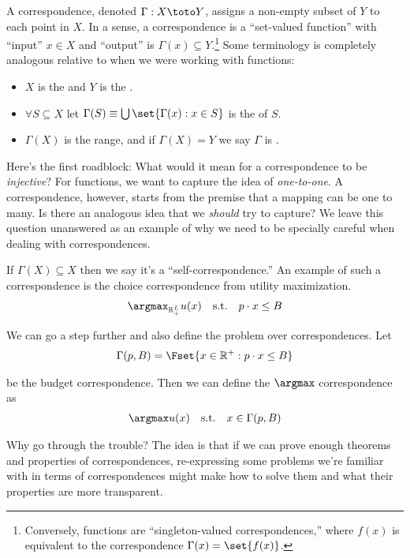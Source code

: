 \documentclass{article}
\begin{document}
A correspondence, denoted $\Gamma: X \toto Y$, assigns a non-empty subset of $Y$ to each point in $X$. In a sense, a correspondence is a ``set-valued function'' with ``input'' $x \in X$ and ``output'' is $\Gamma(x) \subseteq Y$.\footnote{Conversely, functions are ``singleton-valued correspondences,'' where $f(x)$ is equivalent to the correspondence $\Gamma(x) = \set{f(x)}$.} Some terminology is completely analogous relative to when we were working with functions:
\begin{itemize}[label=$\bullet$]
  \item $X$ is the  and $Y$ is the .

  \item $\forall S \subseteq X$ let $\Gamma(S) \equiv \bigcup\set{\Gamma(x): x \in S}$ is the  of $S$.

  \item $\Gamma(X)$ is the range, and if $\Gamma(X) = Y$ we say $\Gamma$ is .
\end{itemize}

Here's the first roadblock: What would it mean for a correspondence to be \textit{injective}? For functions, we want to capture the idea of \textit{one-to-one}. A correspondence, however, starts from the premise that a mapping can be one to many. Is there an analogous idea that we \textit{should} try to capture? We leave this question unanswered as an example of why we need to be specially careful when dealing with correspondences.
\begin{example}
  If $\Gamma(X) \subseteq X$ then we say it's a ``self-correspondence.'' An example of such a correspondence is the choice correspondence from utility maximization.
  \begin{align*}
    \argmax_{\mathbb{R}^L_+} u(x)
    \quad
    \text{s.t.}
    \quad
    p \cdot x \le B
  \end{align*}

  We can go a step further and also define the problem over correspondences. Let
  \begin{align*}
    \Gamma(p, B)
    =
    \Fset{x \in \mathbb{R}^+: p \cdot x \le B}
  \end{align*}

  be the budget correspondence. Then we can define the $\argmax$ correspondence as
  \begin{align*}
    \argmax u(x)
    \quad
    \text{s.t.}
    \quad
    x \in \Gamma(p, B)
  \end{align*}

  Why go through the trouble? The idea is that if we can prove enough theorems and properties of correspondences, re-expressing some problems we're familiar with in terms of correspondences might make how to solve them and what their properties are more transparent.
\end{example}
\end{document}
